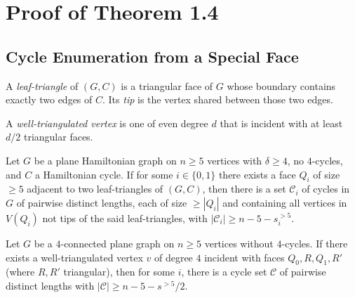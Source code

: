 \chapter{Proof of Theorem 1.4}

\section{Cycle Enumeration from a Special Face}

\begin{definition}
  \label{def:leaf_triangle}
  \notready
  A \emph{leaf-triangle} of $(G, C)$ is a triangular face of $G$ whose
  boundary contains exactly two edges of $C$. Its \emph{tip} is the vertex
  shared between those two edges.
\end{definition}

\begin{definition}
  \label{def:well_triangulated}
  \notready
  A \emph{well-triangulated vertex} is one of even degree $d$ that is
  incident with at least $d/2$ triangular faces.
\end{definition}

\begin{lemma}
  \label{lem:enumeration}
  \notready
  Let $G$ be a plane Hamiltonian graph on $n \ge 5$ vertices with
  $\delta \ge 4$, no $4$-cycles, and $C$ a Hamiltonian cycle. If for some
  $i \in \{0,1\}$ there exists a face $Q_i$ of size $\ge 5$ adjacent to two
  leaf-triangles of $(G, C)$, then there is a set $\mathcal{C}_i$ of cycles
  in $G$ of pairwise distinct lengths, each of size $\ge |Q_i|$ and containing
  all vertices in $V(Q_i)$ not tips of the said leaf-triangles, with
  $|\mathcal{C}_i| \ge n - 5 - s_i^{>5}$.
\end{lemma}

\begin{corollary}[Corollary 5.2]
  \label{cor:well_triang_enum}
  \notready
  Let $G$ be a $4$-connected plane graph on $n \ge 5$ vertices without
  $4$-cycles. If there exists a well-triangulated vertex $v$ of degree $4$
  incident with faces $Q_0, R, Q_1, R'$ (where $R, R'$ triangular), then
  for some $i$, there is a cycle set $\mathcal{C}$ of pairwise distinct
  lengths with $|\mathcal{C}| \ge n - 5 - s^{>5}/2$.
\end{corollary}

